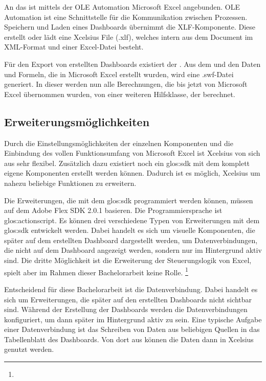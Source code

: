 \begin{onehalfspacing}
An das  ist mittels der OLE Automation Microsoft Excel angebunden. OLE Automation ist eine Schnittstelle für die Kommunikation zwischen Prozessen. Speichern und Laden eines Dashboards übernimmt die XLF-Komponente. Diese erstellt oder lädt eine \gls{Xcelsius} File (.xlf), welches intern aus dem Document im \gls{XML}-Format und einer Excel-Datei besteht.

Für den Export von erstellten Dashboards existiert der . Aus dem  und den Daten und Formeln, die in Microsoft Excel erstellt wurden, wird eine .swf-Datei generiert. In dieser werden nun alle Berechnungen, die bis jetzt von Microsoft Excel übernommen wurden, von einer weiteren Hilfsklasse, der  berechnet.

\subsection{Erweiterungsmöglichkeiten}

Durch die Einstellungsmöglichkeiten der einzelnen Komponenten und die Einbindung des vollen Funktionsumfang von Microsoft Excel ist \gls{Xcelsius} von sich aus sehr flexibel. Zusätzlich dazu existiert noch ein \gls{glos:sdk} mit dem komplett eigene Komponenten erstellt werden können. Dadurch ist es möglich, \gls{Xcelsius} um nahezu beliebige Funktionen zu erweitern.

Die Erweiterungen, die mit dem \gls{glos:sdk} programmiert werden können, müssen auf dem Adobe Flex SDK 2.0.1 basieren. Die Programmiersprache ist \gls{glos:actionscript}. Es können drei verschiedene Typen von Erweiterungen mit dem \gls{glos:sdk} entwickelt werden. Dabei handelt es sich um visuelle Komponenten, die später auf dem erstellten Dashboard dargestellt werden, um Datenverbindungen, die nicht auf dem Dashboard angezeigt werden, sondern nur im Hintergrund aktiv sind. Die dritte Möglichkeit ist die Erweiterung der Steuerungslogik von Excel, spielt aber im Rahmen dieser Bachelorarbeit keine Rolle. \footnote{ }

Entscheidend für diese Bachelorarbeit ist die Datenverbindung. Dabei handelt es sich um Erweiterungen, die später auf den erstellten Dashboards nicht sichtbar sind. Während der Erstellung der Dashboards werden die Datenverbindungen konfiguriert, um dann später im Hintergrund aktiv zu sein. Eine typische Aufgabe einer Datenverbindung ist das Schreiben von Daten aus beliebigen Quellen in das Tabellenblatt des Dashboards. Von dort aus können die Daten dann in Xcelsius genutzt werden.


\end{onehalfspacing}
